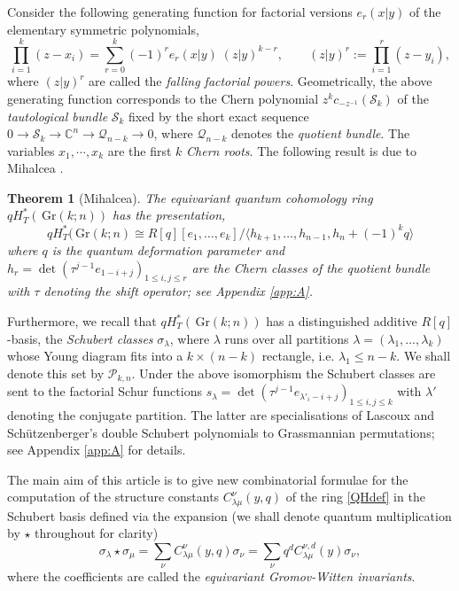 \documentclass[12pt]{amsart}
\newcommand{\C}{\mathbb{C}}
\newcommand{\cS}{\mathcal{S}}
\newcommand{\cQ}{\mathcal{Q}}
\newcommand{\Gr}{\,\mathrm{Gr}}
\newcommand{\mc}[1]{\mathcal{#1}}
\newcommand{\ring}{R}
\newtheorem{thm}{Theorem}[section]
\numberwithin{equation}{section}
\numberwithin{figure}{section}
\begin{document}
Consider the following generating function for factorial versions $e_r(x|y)$ of the elementary symmetric polynomials,
\[
\prod_{i=1}^k(z-x_i)=\sum_{r=0}^k(-1)^re_r(x|y)\;(z|y)^{k-r},\qquad(z|y)^r:=\prod_{i=1}^r(z-y_i),
\]
where $(z|y)^r$ are called the {\em falling factorial powers}. Geometrically, the above generating function corresponds to the Chern polynomial $z^kc_{-z^{-1}}(\cS_k)$ of the {\em tautological bundle} $\cS_k$ fixed by the short exact sequence $0\to \cS_k\to\C^n\to \cQ_{n-k}\to 0$, where $\cQ_{n-k}$ denotes the {\em quotient bundle}. The variables $x_1,\cdots,x_k$ are the first $k$ {\em Chern roots}. The following result is due to Mihalcea \cite[Thm 1.1]{Mihalcea}.
\begin{thm}[Mihalcea]
    The equivariant quantum cohomology ring $qH^*_T(\Gr(k;n))$ has the presentation,
    \begin{equation}\label{QHdef}
    qH^*_T(\Gr(k;n)\cong\ring[q][e_1,\ldots,e_k]/\langle h_{k+1},\ldots,h_{n-1},h_n+(-1)^kq\rangle
    \end{equation}
    where $q$ is the quantum deformation parameter and $h_r=\det(\tau^{j-1}e_{1-i+j})_{1\le i,j\le r}$ are the Chern classes of the quotient bundle with $\tau$ denoting the shift operator; see Appendix \ref{app:A}.
\end{thm}
Furthermore, we recall that $qH^*_T(\Gr(k;n))$ has a distinguished additive $\ring[q]$-basis, the {\em Schubert classes} $\sigma_\lambda$, where $\lambda$ runs over all partitions $\lambda=(\lambda_1,\ldots,\lambda_k)$ whose Young diagram fits into a $k\times (n-k)$ rectangle, i.e. $\lambda_1\le n-k$. We shall denote this set by $\mc{P}_{k,n}$. Under the above isomorphism the Schubert classes are sent to the factorial Schur functions $s_\lambda=\det(\tau^{j-1}e_{\lambda'_i-i+j})_{1\le i,j\le k}$ with $\lambda'$ denoting the conjugate partition. The latter are specialisations of Lascoux and Sch\"utzenberger's double Schubert polynomials to Grassmannian permutations; see Appendix \ref{app:A} for details.

The main aim of this article is to give new combinatorial formulae for the computation of the structure constants $C_{\lambda\mu}^{\nu}(y,q)$ of the ring \eqref{QHdef} in the Schubert basis defined via the expansion (we shall denote quantum multiplication by $\star$ throughout for clarity)
\begin{equation}\label{EGWdef}
\sigma_\lambda\star\sigma_\mu=\sum_{\nu}C^{\nu}_{\lambda\mu}(y,q)\sigma_\nu=
\sum_{\nu}q^dC^{\nu,d}_{\lambda\mu}(y)\sigma_\nu,
\end{equation}
where the coefficients are called the {\em equivariant Gromov-Witten invariants}. 
\end{document}

